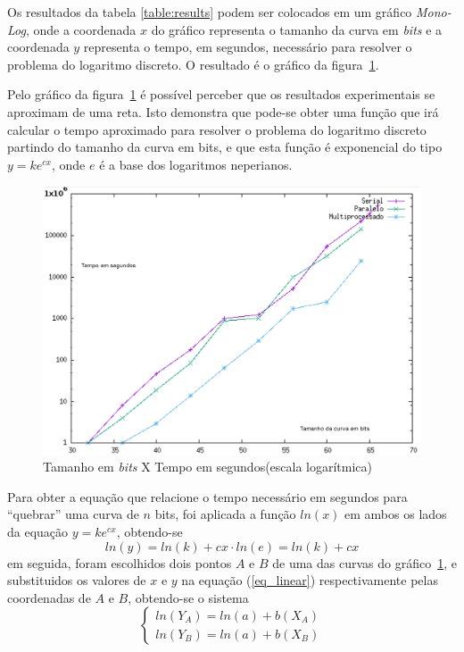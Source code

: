 Os resultados da tabela \ref{table:results} podem ser colocados em um gráfico \textit{Mono-Log}, onde a coordenada $x$ do gráfico representa o tamanho da curva em \textit{bits} e a coordenada $y$ representa o tempo, em segundos, necessário para resolver o problema do logaritmo discreto. O resultado é o gráfico da figura~\ref{grafico1}.

Pelo gráfico da figura~\ref{grafico1} é possível perceber que os resultados experimentais se aproximam de uma reta. Isto demonstra que pode-se obter uma função que irá calcular o tempo aproximado para resolver o problema do logaritmo discreto partindo do tamanho da curva em bits, e que esta função é exponencial do tipo \(y = ke^{cx}\), onde $e$ é a base dos logaritmos neperianos.

\begin{figure}
\centering
\includegraphics[scale=0.6, bb=0 0 515 478]{figuras/grafico1.eps}
\caption{Tamanho em \textit{bits} X Tempo em segundos(escala logarítmica)}
\label{grafico1}
\end{figure}

Para obter a equação que relacione o tempo necessário em segundos para ``quebrar'' uma curva de $n$ bits, foi aplicada a função \(ln(x)\) em ambos os lados da equação \(y = ke^{cx}\), obtendo-se
\begin{equation} \label{eq_linear}
	ln(y) = ln(k) + cx\cdot ln(e) = ln(k) + cx
\end{equation}
em seguida, foram escolhidos dois pontos \(A\) e \(B\) de uma das curvas do gráfico~\ref{grafico1}, e substituidos os valores de \(x\) e \(y\) na equação (\ref{eq_linear}) respectivamente pelas coordenadas de \(A\) e \(B\), obtendo-se o sistema
$$
\left\{ \begin{array}{c}	
ln(Y_A) = ln(a) + b(X_A)\\
ln(Y_B) = ln(a) + b(X_B)
\end{array}
\right.
$$

